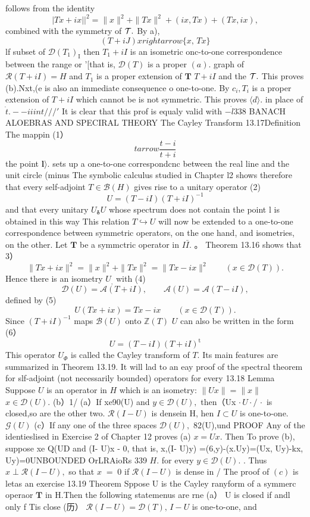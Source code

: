 follows from the identity $$ |T x+i x||^{2}=\|x\|^{2}+\|T x\|^{2}+(i x,T x)+(T x,i x), $$ combined with the symmetry of ${\cal T}.$ By a), $$ (T+i J)x rightarrow\{x,\,T x\} $$ lf subset of ${\mathcal{D}}(T_{1})_{\mathrm{{I}}}$ then $T_{1}+i I$ is an isometric onc-to-one correspondence between the range or '[that is, ${\mathcal{D}}(T)$ is a proper $(a).$ graph of ${\mathcal{R}}(T+i I)=H$ and $T_{1}$ is a proper extension of ${\boldsymbol{T}}$ $T+i I$ and the ${\cal T}.$ This proves (b).Nxt,(e is also an immediate consequence o one-to-one. By $c_{i},T_{i}$ is a proper extension of $T+i I$ which cannot be is not symmetric. This proves $\langle d\rangle.$ in place of ${\dot{t}}.--iiint\!/\!/{\slash{\prime}}$ It is clear that this prof is equaly valid with $-{\dot{l}}$338 BANACH ALOEBRAS AND SPECIRAL THEORY The Cayley Transform 13.17Definition The mappin (1） $$ t arrow{\frac{t-i}{t+i}} $$ the point $\mathbf{l}\rangle.$ sets up a one-to-one correspondcnc between the real line and the unit circle (minus The symbolic calculus studied in Chapter l2 shows therefore that every self-adjoint $T\in{\mathcal{B}}(H)$ gives rise to a unitary operator (2) $$ U=(T-i I)(T+i I)^{-1} $$ and that every unitary $U_{\mathbf{\delta}}U$ whose spectrum does not contain the point l is obtained in this way This relation $T\hookrightarrow U$ will now be extended to a one-to-one correspondence between symmetric operators, on the one hand, and isometries, on the other. Let ${\boldsymbol{T}}$ be a symmctric operator in $I{\bar{I}}.$ 。 Theorem 13.16 shows that 3） $$ \|T x+i x\|^{2}=\|x\|^{2}+\|T x\|^{2}=\|T x-i x\|^{2}\qquad(x\in{\mathcal{D}}(T)). $$ Hence there is an isometry $U_{\mathrm{,}}$ with (4) $$ \mathcal{D}(U)=\mathcal{A}(T+i I),\qquad\mathcal{A}(U)=\mathcal{A}(T-i I), $$ defined by (5) $$ U(T x+i x)=T x-i x\qquad(x\in{\mathcal{D}}(T)). $$ Since $(T+i I)^{-1}$ maps $\mathcal{B}(U)$ onto $\mathbb{Z}(T)$ $U$ can also be written in the form (6） $$ U=(T-i I)(T+i I)^{\textrm{t}} $$ This operator $U_{\mathit{\Phi}}$ is called the Cayley transform of $\textstyle T.$ Its main features are summarized in Theorem 13.19. It will lad to an eay proof of the spectral theorem for slf-adjoint (not necessarily bounded) operators for every 13.18 Lemma Suppose $U$ is an operator in $\textstyle{H}$ which is an isometry: $\|U x\|=\|x\|$ $x\in{\mathcal{D}}(U).$ (b）1/ (a）If xe90(U) and $y\in{\mathcal{D}}(U),$ then（Ux $\cdot\,U\!\cdot\!\slash\,\cdot$ is closed,so are the other two. ${\mathcal{R}}(I-U)$ is densein H, hen $I\subset U$ is one-to-one. ${\mathcal{G}}(U)$ (c）If any one of the three spaces ${\mathcal{D}}(U),$ 82(U),und PROOF Any of the identieslised in Exercise 2 of Chapter 12 proves (a) $x=U x.$ Then To prove (b), suppose xe Q(UD and (I- U)x - 0, that is, x,(I- U)y) =(6,y)-(x.Uy)=(Ux, Uy)-kx, Uy)=0UNBOUNDED OrLRAioRs 339 $\textstyle H.$ for every $y\in{\mathcal{D}}(U).$ . Thus $x\perp\mathcal{R}(I-U),$ so that $\scriptstyle x\;=\;0$ if ${\mathcal{R}}(I-U)$ is dense in / The proof of $\left(c\right)$ is letas an exercise 13.19 Theorem Sppose U is the Cayley ranyform of a symmerc operaor ${\boldsymbol{T}}$ in H.Then the following statemenus are rne (a） U is closed if andl only f Tis close (历） $\mathcal{R}(I-U)=\mathcal{D}(T),\,I-U$ is one-to-one, and 